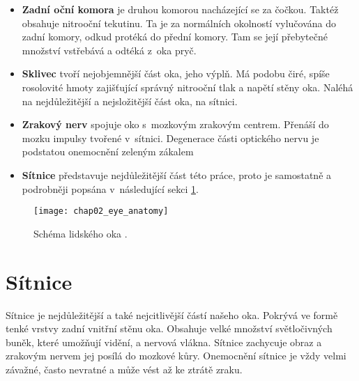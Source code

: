 \begin{itemize}
  \item\textbf{Zadní oční komora} je druhou komorou nacházející se za čočkou. Taktéž obsahuje nitrooční tekutinu. Ta je za normálních okolností vylučována do zadní komory, odkud protéká do přední komory. Tam se její přebytečné množství vstřebává a odtéká z~oka pryč.
  \item\textbf{Sklivec} tvoří nejobjemnější část oka, jeho výplň. Má podobu čiré, spíše rosolovité hmoty zajišťující správný nitrooční tlak a napětí stěny oka. Naléhá na nejdůležitější a nejsložitější část oka, na sítnici.
  \item\textbf{Zrakový nerv} spojuje oko s~mozkovým zrakovým centrem. Přenáší do mozku impulsy tvořené v~sítnici. Degenerace části optického nervu je podstatou onemocnění zeleným zákalem
  \item\textbf{Sítnice} představuje nejdůležitější část této práce, proto je samostatně a podrobněji popsána v~následující sekci \ref{sec:sitnice}.
\end{itemize}

\begin{figure}[h]
  \begin{center}
    \texttt{[image: chap02\_eye\_anatomy]}
    \caption{Schéma lidského oka \cite{pic_eye_anatomy}.}
    \label{pic:chap02_eye_anatomy}
  \end{center}
\end{figure}
\newpage 

\section{Sítnice}
\label{sec:sitnice}
Sítnice je nejdůležitější a také nejcitlivější částí našeho oka. Pokrývá ve formě tenké vrstvy zadní vnitřní stěnu oka. Obsahuje velké množství světločivných buněk, které umožňují vidění, a nervová vlákna. Sítnice zachycuje obraz a zrakovým nervem jej posílá do mozkové kůry. Onemocnění sítnice je vždy velmi závažné, často nevratné a může vést až ke ztrátě zraku.

